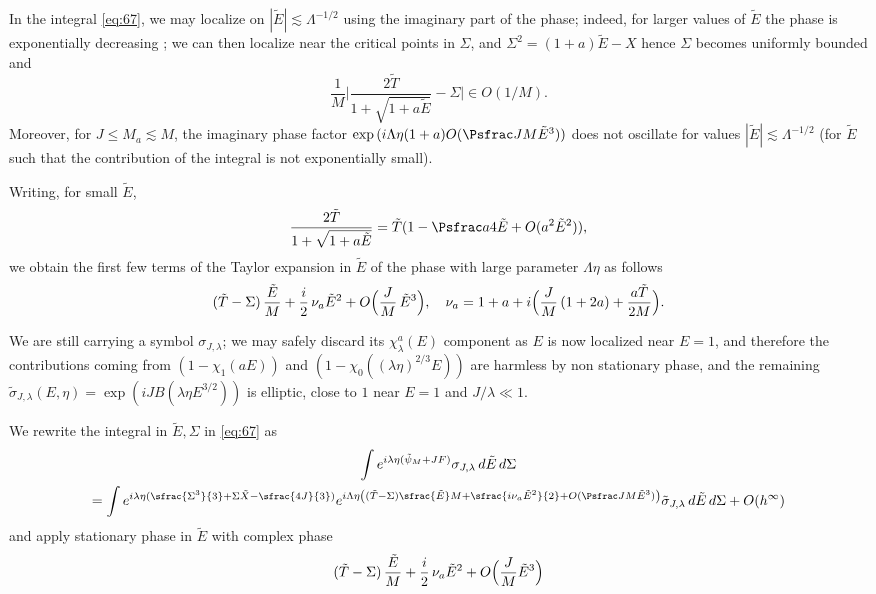 \begin{rmq}\label{rmkimagphase}
In the integral \eqref{eq:67}, we may localize on $|{\tilde E}|\lesssim\Lambda^{-1/2}$ using the imaginary part of the phase; indeed, for larger values of ${\tilde E}$ the phase is exponentially decreasing ; we can then localize near the critical points in $\Sigma$, and $\Sigma^{2}=(1+a){\tilde E}-X$ hence $\Sigma$ becomes uniformly bounded and
\[
\frac 1M\biggl|\frac{2\tilde T}{1+\sqrt{1+a{\tilde E}}}-\Sigma\biggr| \in O(1/M).
\]
Moreover, for $J\leq M_a\lesssim M$, the imaginary phase factor $\exp{(i\Lambda\eta(1+a)O(\Psfrac JM {\tilde E}^3)})$ does not oscillate for values $|{\tilde E}|\lesssim \Lambda^{-1/2}$ (\ie for ${\tilde E}$ such that the contribution of the integral is not exponentially small).
\end{rmq}
\begin{rmq}
Writing, for small ${\tilde E}$,
\[
\frac{2\tilde T}{1+\sqrt{1+a{\tilde E}}}= \tilde T(1-\Psfrac a4 {\tilde E}+O(a^2{\tilde E}^2)),
\]
we obtain the first few terms of the Taylor expansion in $\tilde E$ of the phase with large parameter $\Lambda \eta$ as follows
\[
(\tilde T-\Sigma)\,\frac {\tilde E}M+\frac i2\, \nu_a {\tilde E}^2+O\Bigl(\frac JM\, {\tilde E}^3\Bigl),\quad \nu_a=1+a+i \Bigl(\frac JM\,(1+2a)+\frac{a \tilde T}{2M}\Bigr).
\]
\end{rmq}
\begin{rmq}
We are still carrying a symbol $\sigma_{J,\lambda}$; we may safely discard its $\chi_{\lambda}^{a}(E)$ component as $E$ is now localized near $E=1$, and therefore the contributions coming from $(1-\chi_{1}(aE))$ and $(1-\chi_0((\lambda\eta)^{2/3}E))$ are harmless by non stationary phase, and the remaining $\tilde \sigma_{J,\lambda}(E,\eta)=\exp(i J B(\lambda \eta E^{3/2}))$ is elliptic, close to $1$ near $E=1$ and $J/\lambda \ll 1$.
\end{rmq}
We rewrite the integral in ${\tilde E},\Sigma$ in \eqref{eq:67} as
\begin{multline*}
\int e^{i \lambda\eta (\tilde\psi_{M}+JF)} \sigma_{J,\lambda}\,d{\tilde E} \,d\Sigma\\ = \int e^{i \lambda\eta (\sfrac{\Sigma^3}{3}+\Sigma \tilde X-\sfrac{4J}{3})} e^{i \Lambda \eta \left((\tilde T-\Sigma) \sfrac {\tilde E} M + \sfrac{i\nu_a {\tilde E}^{2}}{2}+O(\Psfrac J M {\tilde E}^{3})\right)}  \tilde \sigma_{J,\lambda }\,d{\tilde E} \,d\Sigma +O(h^{\infty})
\end{multline*}
and apply stationary phase in ${\tilde E}$ with complex phase
\[
(\tilde T-\Sigma)\, \frac {\tilde E} M + \frac i2\, \nu_a {\tilde E}^{2}+O\Bigl(\frac J M {\tilde E}^{3}\Bigr)
\]

